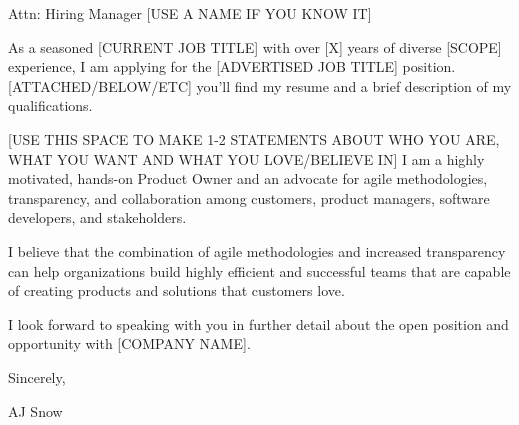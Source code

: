 \documentclass[10pt,stdletter,dateno]{newlfm}
\begin{document}
\begin{newlfm}

	Attn: Hiring Manager [USE A NAME IF YOU KNOW IT]
	
	As a seasoned [CURRENT JOB TITLE] with over [X] years of diverse [SCOPE] experience,
	I am applying for the [ADVERTISED JOB TITLE]  position.
		[ATTACHED/BELOW/ETC] you'll find my resume and a brief description of my
	qualifications.

		[USE THIS SPACE TO MAKE 1-2 STATEMENTS ABOUT WHO YOU ARE, WHAT YOU WANT AND
			WHAT YOU LOVE/BELIEVE IN]  I am a highly motivated, hands-on Product Owner and an
	advocate for agile methodologies, transparency, and collaboration among customers,
	product managers, software developers, and stakeholders.

	I believe that the combination of agile methodologies and increased transparency can
	help organizations build highly efficient and successful teams that are capable of
	creating products and solutions that customers love.

	I look forward to speaking with you in further detail about the open position and opportunity with [COMPANY NAME].

	Sincerely,


	AJ Snow

\end{newlfm}
\end{document}
